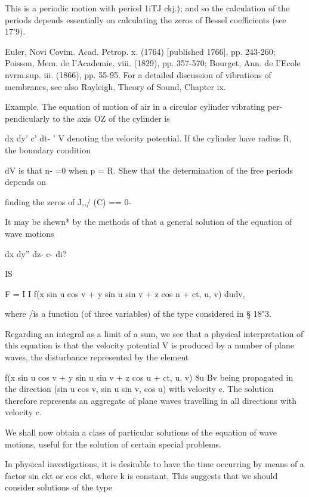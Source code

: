 This is a periodic motion with period 1iTJ ckj.); and so the
calculation of the periods depends essentially on calculating the
zeros of Bessel coefficients (see 17'9).

 Euler, Novi Covim. Acad. Petrop. x. (1764) [published 1766], pp.
243-260; Poisson, Mem. de I'Academie, viii. (1829), pp. 357-570;
Bourget, Ann. de I'Ecole nvrm.sup. iii. (1866), pp. 55-95. For a
detailed discussion of vibrations of membranes, see also Rayleigh,
Theory of Sound, Chapter ix.

%
%

Example. The equation of motion of air in a circular cylinder
vibrating per- pendicularly to the axis OZ of the cylinder is

dx dy' c' dt- ' V denoting the velocity potential. If the cylinder
have radius R, the boundary condition

dV is that n- =0 when p = R. Shew that the determination of the free
periods depends on

finding the zeros of J,,/ (C) == 0-

It may be
shewn* by the methods of  that a general solution of the equation
of wave motions

dx dy'' dz- c- di?

IS

F = I I f(x sin u cos v + y sin u sin v + z cos n + ct, u, v) dudv,

where /is a function (of three variables) of the type considered in §
18"3.

Regarding an integral as a limit of a sum, we see that a physical
interpretation of this equation is that the velocity potential V is
produced by a number of plane waves, the disturbance represented by
the element

f(x sin u cos v + y sin u sin v + z cos u + ct, u, v) 8u Bv being
propagated in the direction (sin u cos v, sin u sin v, cos u) with
velocity c. The solution therefore represents an aggregate of plane
waves travelling in all directions with velocity c.


We shall now obtain a class of particular solutions of the equation of
wave motions, useful for the solution of certain special problems.

In physical investigations, it is desirable to have the time occurring
by means of a factor sin ckt or cos ckt, where k is constant. This
suggests that we should consider solutions of the type

